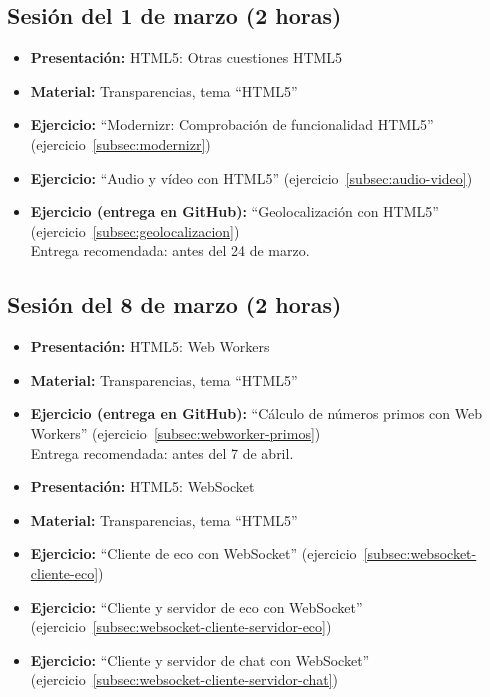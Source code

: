 \documentclass[a4paper,12pt]{report}
\begin{document}
\subsection{Sesión del 1 de marzo (2 horas)}

\begin{itemize}
 \item \textbf{Presentación:} HTML5: Otras cuestiones HTML5
 \item \textbf{Material:} Transparencias, tema ``HTML5''
 \item \textbf{Ejercicio:} ``Modernizr: Comprobación de funcionalidad HTML5'' (ejercicio~\ref{subsec:modernizr})
 \item \textbf{Ejercicio:} ``Audio y vídeo con HTML5'' (ejercicio~\ref{subsec:audio-video})
 \item \textbf{Ejercicio (entrega en GitHub):} ``Geolocalización con HTML5'' (ejercicio~\ref{subsec:geolocalizacion}) 
 \\
Entrega recomendada: antes del 24 de marzo.
\end{itemize}


\subsection{Sesión del 8 de marzo (2 horas)}

\begin{itemize}
 \item \textbf{Presentación:} HTML5: Web Workers
 \item \textbf{Material:} Transparencias, tema ``HTML5''
 \item \textbf{Ejercicio (entrega en GitHub):} ``Cálculo de números primos con Web Workers'' (ejercicio~\ref{subsec:webworker-primos})
 \\
Entrega recomendada: antes del 7 de abril.
 \item \textbf{Presentación:} HTML5: WebSocket
 \item \textbf{Material:} Transparencias, tema ``HTML5''
 \item \textbf{Ejercicio:} ``Cliente de eco con WebSocket'' (ejercicio~\ref{subsec:websocket-cliente-eco})
 \item \textbf{Ejercicio:} ``Cliente y servidor de eco con WebSocket'' (ejercicio~\ref{subsec:websocket-cliente-servidor-eco})
 \item \textbf{Ejercicio:} ``Cliente y servidor de chat con WebSocket'' (ejercicio~\ref{subsec:websocket-cliente-servidor-chat})
\end{itemize}
\end{document}

